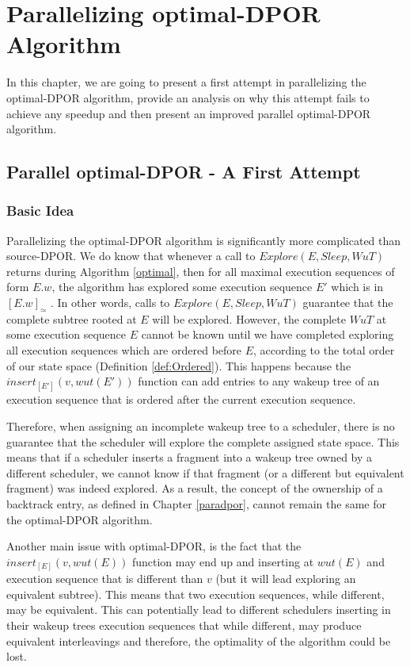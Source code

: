 \chapter{Parallelizing optimal-DPOR Algorithm}
\label{paradpor_opt}

In this chapter, we are going to present a first attempt in parallelizing the optimal-DPOR
algorithm, provide an analysis on why this attempt fails to achieve any speedup and then present 
an improved parallel optimal-DPOR algorithm.


\section{Parallel optimal-DPOR - A First Attempt}

\subsection{Basic Idea}

Parallelizing the optimal-DPOR algorithm is significantly more complicated than source-DPOR. We do know that whenever a call to 
$Explore(E, Sleep, WuT)$ returns during Algorithm \ref{optimal}, then for all maximal execution sequences
of form $E.w$, the algorithm has explored some execution sequence $E'$ which is in $[E.w]_\simeq$ \cite{AbdullaAronisJohnssonSagonasDPOR2014}. In other words, calls to $Explore(E, Sleep, WuT)$ guarantee that the complete subtree rooted
at $E$ will be explored.
However, the complete $WuT$ at some execution sequence $E$ cannot be known until we have completed
exploring all execution sequences which are ordered before $E$, according to the total order of our state space
(Definition \ref{def:Ordered}). This happens because the $insert_{[E']}(v,wut(E'))$ function can add
entries to any wakeup tree of an execution sequence that is ordered after the current execution sequence.

Therefore, when assigning an incomplete wakeup tree to a scheduler, there is no
guarantee that the scheduler will explore the complete assigned state space. This means that if a
scheduler inserts a fragment into a wakeup tree owned by a different scheduler, we cannot know if that 
fragment (or a different but equivalent fragment) was indeed explored. As a result, the concept of the ownership of a 
backtrack entry, as defined in Chapter \ref{paradpor}, cannot remain the same for the optimal-DPOR algorithm.

Another main issue with optimal-DPOR, is the fact that the $insert_{[E]}(v,wut(E))$ function may end up
 and inserting at $wut(E)$ and execution sequence that is different than $v$ (but it will lead exploring an equivalent subtree). This means that two execution sequences, while different,
may be equivalent. This can potentially lead to different schedulers inserting in their
wakeup trees execution sequences that while different, may produce equivalent interleavings and therefore, the optimality
of the algorithm could be lost.

